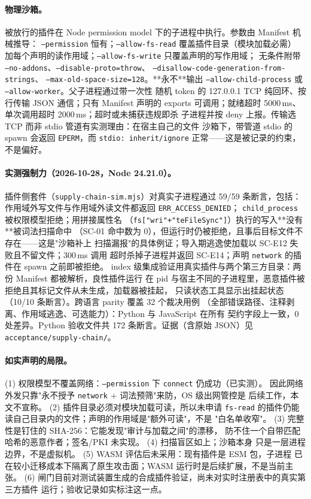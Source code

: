 \paragraph{物理沙箱。}
被放行的插件在 Node permission model 下的子进程中执行。参数由 Manifest 机械推导：
\texttt{--permission} 恒有；\texttt{--allow-fs-read} 覆盖插件目录（模块加载必需）
加每个声明的读作用域；\texttt{--allow-fs-write} 只覆盖声明的写作用域；
无条件附带 \texttt{--no-addons}、\texttt{--disable-proto=throw}、
\texttt{--disallow-code-generation-from-strings}、
\texttt{--max-old-space-size=128}。**永不**输出
\texttt{--allow-child-process} 或 \texttt{--allow-worker}。父子进程通过带一次性
随机 token 的 127.0.0.1 TCP 纯回环、按行传输 JSON 通信；只有 Manifest 声明的
exports 可调用；就绪超时 5000\,ms、单次调用超时 2000\,ms；超时或未捕获违规即杀
子进程并按 deny 上报。传输选 TCP 而非 stdio 管道有实测理由：在宿主自己的文件
沙箱下，带管道 stdio 的 spawn 会返回 \texttt{EPERM}，而
\texttt{stdio: inherit/ignore} 正常——这是被记录的约束，不是偏好。

\paragraph{实测强制力（2026-10-28，Node 24.21.0）。}
插件侧套件（\texttt{supply-chain-sim.mjs}）对真实子进程通过 59/59 条断言，包括：
作用域外写文件与作用域外读文件都返回 \texttt{ERR\_ACCESS\_DENIED}；
\texttt{child\_process} 被权限模型拒绝；用拼接属性名
（\texttt{fs["wri"+"teFileSync"]}）执行的写入**没有**被词法扫描命中
（SC-01 命中数为 0），但运行时仍被拒绝，且事后目标文件不存在——这是"沙箱补上
扫描漏报"的具体例证；导入期逃逸使加载以 SC-E12 失败且不留文件；300\,ms 调用
超时杀掉子进程并返回 SC-E14；声明 \texttt{network} 的插件在 spawn 之前即被拒绝。
index 级集成验证用真实插件与两个第三方目录：两份 Manifest 都被解析，良性插件运行
在 pid 与宿主不同的子进程里，恶意插件被拒绝且其标记文件从未生成，加载器被挂起，
只读状态工具显示出挂起状态（10/10 条断言）。跨语言 parity 覆盖 32 个裁决用例
（全部错误路径、注释剥离、作用域逃逸、可选能力）：Python 与 JavaScript 在所有
契约字段上一致，0 处差异。Python 验收文件共 172 条断言。证据（含原始 JSON）见
\texttt{acceptance/supply-chain/}。

\paragraph{如实声明的局限。}
(1) 权限模型不覆盖网络：\texttt{--permission} 下 \texttt{connect} 仍成功（已实测）。
因此网络外发只靠"永不授予 \texttt{network} + 词法预筛"来防，OS 级出网管控是
后续工作，本文不宣称。 (2) 插件目录必须对模块加载可读，所以未申请
\texttt{fs-read} 的插件仍能读自己目录内的文件；声明的作用域是"额外可读"，不是
"白名单收窄"。 (3) 完整性是钉住的 SHA-256：它能发现"审计与加载之间"的漂移，
防不住一个自带匹配哈希的恶意作者；签名/PKI 未实现。 (4) 扫描盲区如上；沙箱本身
只是一层进程边界，不是虚拟机。 (5) WASM 评估后未采用：现有插件是 ESM 包，子进程
已在较小迁移成本下隔离了原生攻击面；WASM 运行时是后续扩展，不是当前主张。
(6) 闸门目前对测试装置生成的合成插件验证，尚未对实时注册表中的真实第三方插件
运行；验收记录如实标注这一点。

